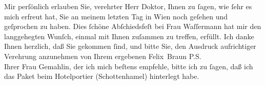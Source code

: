 \pstart
           {\pb}Mir perſönlich erlauben Sie, verehrter Herr Doktor,
               Ihnen zu{ }ſagen, wie{ }ſehr es mich erfreut hat, Sie an meinem letzten Tag in Wien noch geſehen und geſprochen zu haben. Dies{ }ſchöne Abſchiedsfeſt bei Frau Waſſermann hat
               mir den langgehegten Wunſch, einmal mit Ihnen zuſammen zu treffen, erfüllt. Ich danke
               Ihnen herzlich, daß Sie gekommen{ }ſind, und bitte Sie, den Ausdruck aufrichtiger
               Verehrung anzunehmen von Ihrem ergebenen\pend
           \pstart \spacefill\mbox{Felix Braun}\pend{}
\pstart
           \noindent{}P.S.{\\}Ihrer Frau
                     Gemahlin, der ich mich beſtens empfehle, bitte ich zu{ }ſagen, daß ich das
                  Paket beim Hotelportier (Schottenhamel)
                  hinterlegt habe.\pend
           \endnumbering{}  \newcommand{\dateiname}{L02285}\newcommand{\titel}{Felix Braun an Arthur Schnitzler, 21. 4. 1918}\newcommand{\editorInnen}{Martin Anton Müller und Gerd-Hermann Susen}
